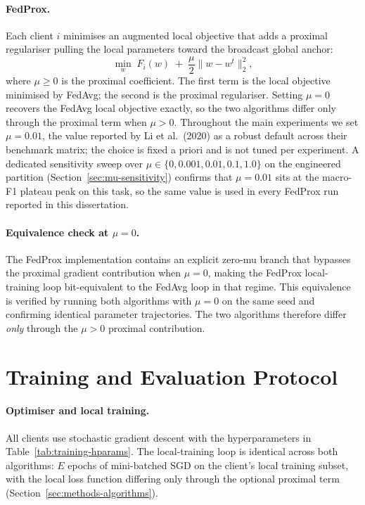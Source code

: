 \documentclass[11pt,a4paper]{report}
\begin{document}
\paragraph{FedProx.}
Each client $i$ minimises an augmented local objective that adds
a proximal regulariser pulling the local parameters toward the
broadcast global anchor:
\[
\min_{w} \; F_i(w) \;+\; \frac{\mu}{2} \lVert w - w^t \rVert_2^2,
\]
where $\mu \geq 0$ is the proximal coefficient. The first term is
the local objective minimised by FedAvg; the second is the
proximal regulariser. Setting $\mu = 0$ recovers the FedAvg local
objective exactly, so the two algorithms differ only through the
proximal term when $\mu > 0$. Throughout the main experiments we
set $\mu = 0.01$, the value reported by Li et al.\ (2020) as a
robust default across their benchmark matrix; the choice is
fixed a priori and is not tuned per experiment. A dedicated
sensitivity sweep over $\mu \in \{0, 0.001, 0.01, 0.1, 1.0\}$ on
the engineered partition (Section~\ref{sec:mu-sensitivity})
confirms that $\mu = 0.01$ sits at the macro-F1 plateau peak on
this task, so the same value is used in every FedProx run
reported in this dissertation.

\paragraph{Equivalence check at $\mu = 0$.}
The FedProx implementation contains an explicit zero-mu branch
that bypasses the proximal gradient contribution when $\mu = 0$,
making the FedProx local-training loop bit-equivalent to the
FedAvg loop in that regime. This equivalence is verified by
running both algorithms with $\mu = 0$ on the same seed and
confirming identical parameter trajectories. The two algorithms
therefore differ \emph{only} through the $\mu > 0$ proximal
contribution.

\section{Training and Evaluation Protocol}
\label{sec:methods-protocol}

\paragraph{Optimiser and local training.}
All clients use stochastic gradient descent with the
hyperparameters in Table~\ref{tab:training-hparams}. The
local-training loop is identical across both algorithms: $E$
epochs of mini-batched SGD on the client's local training
subset, with the local loss function differing only through the
optional proximal term (Section~\ref{sec:methods-algorithms}).
\end{document}

